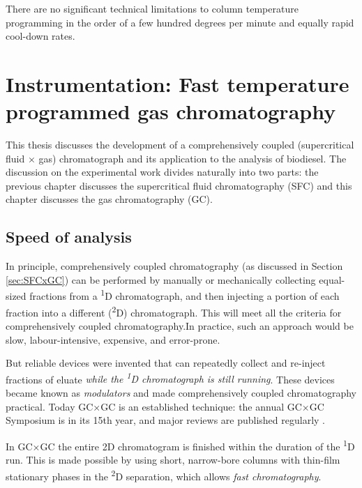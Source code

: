 
\begin{savequote}[45mm]
There are no significant technical limitations
to column temperature programming in the
order of a few hundred degrees per minute and
equally rapid cool-down rates.
\end{savequote}

\chapter{Instrumentation: Fast temperature programmed gas chromatography} %

\label{Chapter5} %


This thesis discusses the development of a comprehensively coupled
(supercritical fluid × gas) chromatograph and its application to the analysis of
biodiesel. The discussion on the experimental work divides naturally into two
parts: the previous chapter discusses the supercritical fluid chromatography
(SFC) and this chapter discusses the gas chromatography (GC).


\section{Speed of analysis}

In principle, comprehensively coupled chromatography (as discussed in Section
\ref{sec:SFCxGC}) can be performed by manually or mechanically collecting
equal-sized fractions from a \textsuperscript{1}D chromatograph, and then
injecting a portion of each fraction into a different (\textsuperscript{2}D)
chromatograph. This will meet all the criteria for comprehensively coupled
chromatography.In practice, such an approach would be slow, labour-intensive,
expensive, and error-prone.

But reliable devices were invented that can repeatedly collect and re-inject
fractions of eluate \textit{while the \textsuperscript{1}D chromatograph is
still running}. These devices became known as \textit{modulators} and made
comprehensively coupled chromatography practical. Today GC×GC is an established
technique: the annual GC×GC Symposium is in its 15th year, and major reviews are
published regularly \autocite{Seeley2013,Prebihalo2018}.

In GC×GC the entire 2D chromatogram is finished within the duration of the
\textsuperscript{1}D run. This is made possible by using short, narrow-bore
columns with thin-film stationary phases in the \textsuperscript{2}D separation,
which allows \textit{fast chromatography}.

